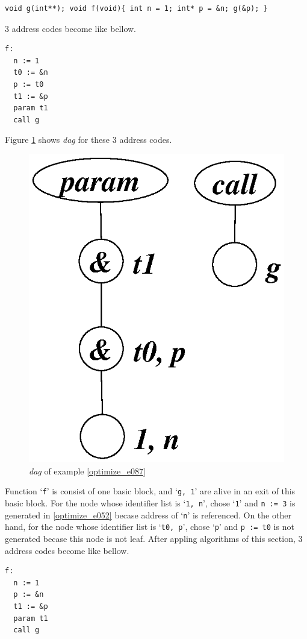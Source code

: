 \begin{Example}
\label{optimize_e087}
\begin{verbatim}
void g(int**); void f(void){ int n = 1; int* p = &n; g(&p); }
\end{verbatim}
3 address codes become like bellow.
\begin{verbatim}
f:
  n := 1
  t0 := &n
  p := t0
  t1 := &p
  param t1
  call g
\end{verbatim}
Figure \ref{optimize_e088} shows {\em dag} for these 3 address codes.
\begin{figure}[htbp]
\begin{center}
\includegraphics[width=0.392\linewidth,height=0.5\linewidth]{opt037.eps}
\caption{{\em dag} of example \ref{optimize_e087}}
\label{optimize_e088}
\end{center}
\end{figure}
Function `{\tt{f}}' is consist of one basic block,
and `{\tt{g, 1}}' are alive in an exit of this basic block.
For the node whose identifier list is `{\tt{1, n}}',
chose `{\tt{1}}' and {\tt{n := 3}} is generated in 
\ref{optimize_e052} becase address of `{\tt{n}}' is referenced.
On the other hand, for
the node whose identifier list is `{\tt{t0, p}}',
chose `{\tt{p}}' and {\tt{p := t0}} is not generated
becase this node is not leaf.
After appling algorithms of this section,
3 address codes become like bellow.
\begin{verbatim}
f:
  n := 1
  p := &n
  t1 := &p
  param t1
  call g
\end{verbatim}
\end{Example}

